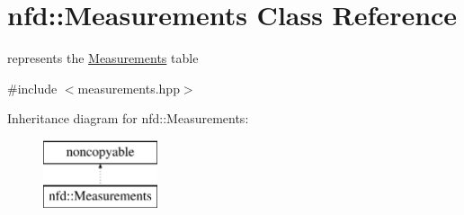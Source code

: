 \hypertarget{classnfd_1_1Measurements}{}\section{nfd\+:\+:Measurements Class Reference}
\label{classnfd_1_1Measurements}


represents the \hyperlink{classnfd_1_1Measurements}{Measurements} table  




{\ttfamily \#include $<$measurements.\+hpp$>$}

Inheritance diagram for nfd\+:\+:Measurements\+:\begin{figure}[H]
\begin{center}
\leavevmode
\includegraphics[height=2.000000cm]{classnfd_1_1Measurements}
\end{center}
\end{figure}

